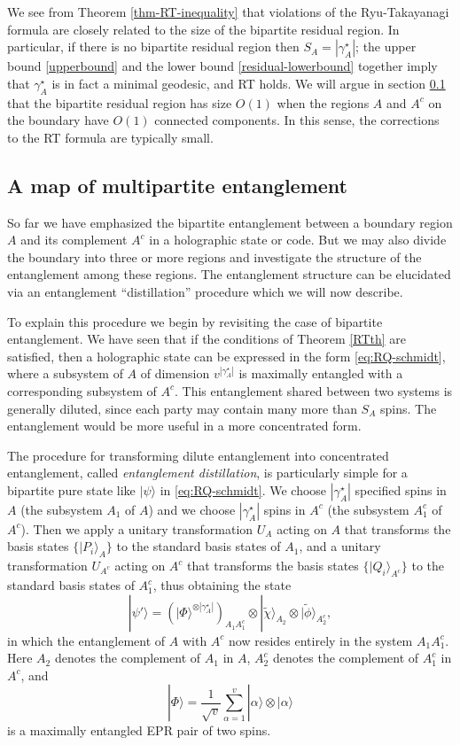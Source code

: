 \documentclass[12pt]{article}
\theoremstyle{plain}
\theoremstyle{plain}
\theoremstyle{plain}
\theoremstyle{plain}
\theoremstyle{result}
\theoremstyle{remark}
\theoremstyle{conjecture}
\theoremstyle{observation}
\theoremstyle{definition}
\theoremstyle{corollary}
\theoremstyle{definition}
\theoremstyle{definition}
\theoremstyle{assumption}
\theoremstyle{definition}
\theoremstyle{problem}
\theoremstyle{fact}
\newcommand{\be}{\begin{equation}}
\newcommand{\ee}{\end{equation}}
\begin{document}
We see from Theorem \ref{thm-RT-inequality} that violations of the Ryu-Takayanagi formula are closely related to the size of the bipartite residual region. In particular, if there is no bipartite residual region then $S_A=|\gamma^\star_A|$; the upper bound \eqref{upperbound} and the lower bound \eqref{residual-lowerbound} together imply that $\gamma^\star_A$ is in fact a minimal geodesic, and RT holds. We will argue in section \ref{subsec-multi-eng} that the bipartite residual region has size $O(1)$ when the regions $A$ and $A^c$ on the boundary have $O(1)$ connected components. In this sense, the corrections to the RT formula are typically small. 

\subsection{A map of multipartite entanglement}\label{subsec-multi-eng}

So far we have emphasized the bipartite entanglement between a boundary region $A$ and its complement $A^c$ in a holographic state or code. But we may also divide the boundary into three or more regions and investigate the structure of the entanglement among these regions. The entanglement structure can be elucidated via an entanglement ``distillation'' procedure which we will now describe.

To explain this procedure we begin by revisiting the case of bipartite entanglement. 
We have seen that if the conditions of Theorem \ref{RTth} are satisfied, then a holographic state can be expressed in the form \eqref{eq:RQ-schmidt}, where a subsystem of $A$ of dimension $v^{|\gamma_A^\star|}$ is maximally entangled with a corresponding subsystem of $A^c$. 
This entanglement shared between two systems is generally diluted, since each party may contain many more than $S_A$ spins. 
The entanglement would be more useful in a more concentrated form. 

The procedure for transforming dilute entanglement into concentrated entanglement, called \textit{entanglement distillation}, is particularly simple for a bipartite pure state like $|\psi\rangle$ in \eqref{eq:RQ-schmidt}. We choose $|\gamma_A^\star|$ specified spins in $A$ (the subsystem $A_1$ of $A$) and we choose $|\gamma_A^\star|$ spins in $A^c$ (the subsystem $A_1^c$ of $A^c$). Then we apply a unitary transformation $U_A$ acting on $A$ that transforms the basis states $\{|P_i\rangle_A\}$ to the standard basis states of $A_1$, and a unitary transformation $U_{A^c}$ acting on $A^c$ that transforms the basis states $\{|Q_i\rangle_{A^c}\}$ to the standard basis states of $A_1^c$, thus obtaining the state 
\be 
|\psi'\rangle = \left(|\Phi\rangle^{\otimes |\gamma_A^\star|} \right)_{A_1A^c_1}\otimes |\tilde \chi\rangle_{A_2}\otimes |\tilde \phi\rangle_{A_2^c},
\ee  
in which the entanglement of $A$ with $A^c$ now resides entirely in the system $A_1 A_1^c$. Here $A_2$ denotes the complement of $A_1$ in $A$, $A_2^c$ denotes the complement of $A_1^c$ in $A^c$, and 
\be
|\Phi\rangle =\frac{1}{\sqrt{v}} \sum_{\alpha=1}^v |\alpha\rangle \otimes |\alpha\rangle
\ee
is a maximally entangled EPR pair of two spins.
\end{document}
